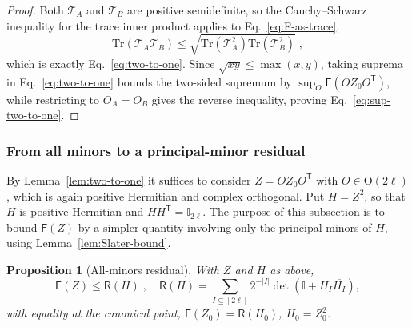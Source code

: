 \documentclass[prx,twocolumn,superscriptaddress,aps,10pt, frontmatterverbose, reprint,footinbib,longbibliography=true]{revtex4-2}
\newtheorem{proposition}{Proposition}
\newcommand{\trans}{\mathsf{T}}
\begin{document}
\begin{proof}
Both $\mathcal{T}_A$ and $\mathcal{T}_B$ are positive semidefinite, so the Cauchy--Schwarz inequality for the trace inner product applies to Eq.~\eqref{eq:F-as-trace},
\begin{equation}
    \mathrm{Tr}\!\left(\mathcal{T}_A\mathcal{T}_B\right)\le\sqrt{\mathrm{Tr}\!\left(\mathcal{T}_A^2\right)\mathrm{Tr}\!\left(\mathcal{T}_B^2\right)}\;,
\end{equation}
which is exactly Eq.~\eqref{eq:two-to-one}. Since $\sqrt{xy}\le\max(x,y)$, taking suprema in Eq.~\eqref{eq:two-to-one} bounds the two-sided supremum by $\sup_O\mathsf{F}(OZ_0O^{\trans})$, while restricting to $O_A=O_B$ gives the reverse inequality, proving Eq.~\eqref{eq:sup-two-to-one}.
\end{proof}


\subsubsection{From all minors to a principal-minor residual}
\label{app:proof:residual}

By Lemma~\ref{lem:two-to-one} it suffices to consider $Z=OZ_0O^{\trans}$ with $O\in\mathrm{O}(2\ell)$,  which is again positive Hermitian and complex orthogonal. Put $H=Z^2$, so that $H$ is positive Hermitian and $HH^{\trans}=\mathbb{I}_{2\ell}$.
The purpose of this subsection is to bound $\mathsf{F}(Z)$ by a simpler quantity involving only the principal minors of $H$, using Lemma~\ref{lem:Slater-bound}.
\begin{proposition}[All-minors residual]
\label{prop:residual}
With $Z$ and $H$ as above,
\begin{equation}
    \mathsf{F}(Z)\le \mathsf{R}(H)\;,\quad \mathsf{R}(H)=\sum_{I\subseteq[2\ell]}2^{-|I|}\det\!\left(\mathbb{I}+H_I\overline{H_I}\right),
    \label{eq:R-definition}
\end{equation}
with equality at the canonical point, $\mathsf{F}(Z_0)=\mathsf{R}(H_0)$, $H_0=Z_0^2$.
\end{proposition}
\end{document}
